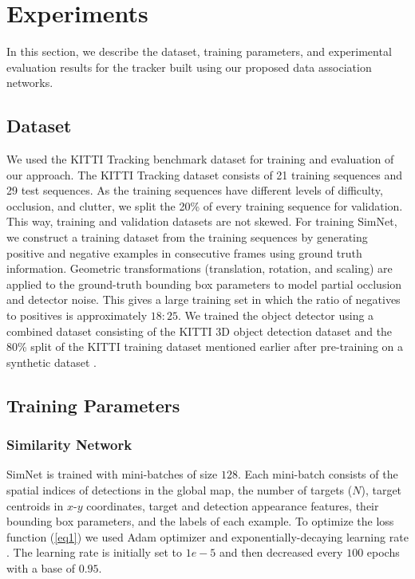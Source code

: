 \documentclass[letterpaper, 10 pt, conference]{ieeeconf}
\begin{document}
\section{Experiments}
In this section, we describe the dataset, training parameters, and experimental evaluation results for the tracker built using our proposed data association networks.

\subsection{Dataset}
We used the KITTI Tracking benchmark dataset for training and evaluation of our approach. The KITTI Tracking dataset consists of 21 training sequences and 29 test sequences. As the training sequences have different levels of difficulty, occlusion, and clutter, we split the 20\% of every training sequence for validation. This way, training and validation datasets are not skewed. For training SimNet, we construct a training dataset from the training sequences by generating positive and negative examples in consecutive frames using ground truth information. Geometric transformations (translation, rotation, and scaling) are applied to the ground-truth bounding box parameters to model partial occlusion and detector noise. This gives a large training set in which the ratio of negatives to positives is approximately $18:25$. We trained the object detector using a combined dataset consisting of the KITTI 3D object detection dataset and the 80\% split of the KITTI training dataset mentioned earlier after pre-training on a synthetic dataset \cite{hurl2019precise}.

\subsection{Training Parameters}
\subsubsection{Similarity Network} SimNet is trained with mini-batches of size $128$. Each mini-batch consists of the spatial indices of detections in the global map, the number of targets ($N$), target centroids in $x$-$y$ coordinates, target and detection appearance features, their bounding box parameters, and the labels of each example. To optimize the loss function (\ref{eq1}) we used Adam optimizer and exponentially-decaying learning rate \cite{Adam}. The learning rate is initially set to $1e-5$ and then decreased every $100$ epochs with a base of $0.95$.
\end{document}
